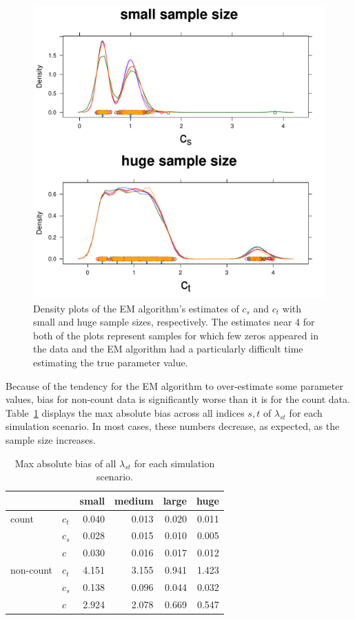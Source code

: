 \begin{figure}
  \centering
  \includegraphics[scale=0.5]{em}
  \caption{Density plots of the EM algorithm's estimates of $c_s$ and $c_t$ with small and huge sample sizes, respectively.  The estimates near $4$ for both of the plots represent samples for which few zeros appeared in the data and the EM algorithm had a particularly difficult time estimating the true parameter value.}
  \label{fig:em}
\end{figure}


Because of the tendency for the EM algorithm to over-estimate some parameter values, bias for non-count data is significantly worse than it is for the count data.  Table~\ref{tab:bias} displays the max absolute bias across all indices $s,t$ of $\lambda_{st}$ for each simulation scenario.  In most cases, these numbers decrease, as expected, as the sample size increases.    

\begin{table}
  \centering
  \begin{tabular}{ll|rrrr}
    & & small & medium & large & huge \\ 
    \hline
    count & $c_t$ & 0.040 & 0.013 & 0.020 & 0.011 \\ 
    & $c_s$ & 0.028 & 0.015 & 0.010 & 0.005 \\ 
    & $c$ & 0.030 & 0.016 & 0.017 & 0.012 \\ 
    non-count & $c_t$ & 4.151 & 3.155 & 0.941 & 1.423 \\ 
    & $c_s$ & 0.138 & 0.096 & 0.044 & 0.032 \\ 
    & $c$ & 2.924 & 2.078 & 0.669 & 0.547 \\ 
  \end{tabular}
  \caption{Max absolute bias of all $\lambda_{st}$ for each simulation scenario.}
  \label{tab:bias}
\end{table}

